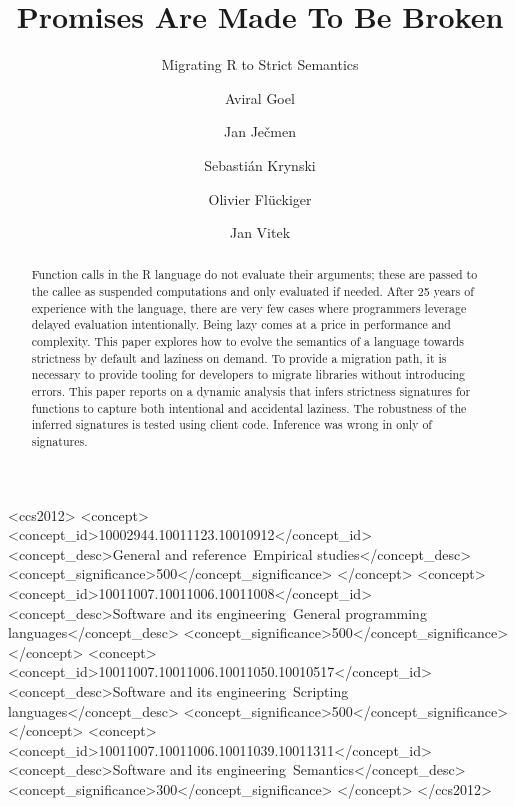 \documentclass[review,creen,acmsmall]{acmart}
\begin{document}
\title{Promises Are Made To Be Broken}
\subtitle{Migrating R to Strict
  Semantics}

\author{Aviral Goel}
\author{Jan Ječmen}
\author{Sebastián Krynski}
\author{Olivier Flückiger}
\author{Jan Vitek}
\authorsaddresses{}
\renewcommand{\shortauthors}{Goel, et al.}

\begin{abstract}
  Function calls in the R language do not evaluate their arguments; these are
  passed to the callee as suspended computations and only evaluated if needed.
  After 25 years of experience with the language, there are very few cases where
  programmers leverage delayed evaluation intentionally. Being lazy comes at a
  price in performance and complexity. This paper explores how to evolve the
  semantics of a language towards strictness by default and laziness on demand.
  To provide a migration path, it is necessary to provide tooling for developers
  to migrate libraries without introducing errors. This paper reports on a
  dynamic analysis that infers strictness signatures for functions to capture
  both intentional and accidental laziness. The robustness of the inferred
  signatures is tested using client code. Inference was wrong in only
  \robustnesResult of signatures.
\end{abstract}

\begin{CCSXML}
<ccs2012>
<concept>
<concept_id>10002944.10011123.10010912</concept_id>
<concept_desc>General and reference~Empirical studies</concept_desc>
<concept_significance>500</concept_significance>
</concept>
<concept>
<concept_id>10011007.10011006.10011008</concept_id>
<concept_desc>Software and its engineering~General programming languages</concept_desc>
<concept_significance>500</concept_significance>
</concept>
<concept>
<concept_id>10011007.10011006.10011050.10010517</concept_id>
<concept_desc>Software and its engineering~Scripting languages</concept_desc>
<concept_significance>500</concept_significance>
</concept>
<concept>
<concept_id>10011007.10011006.10011039.10011311</concept_id>
<concept_desc>Software and its engineering~Semantics</concept_desc>
<concept_significance>300</concept_significance>
</concept>
</ccs2012>
\end{CCSXML}
\end{document}
